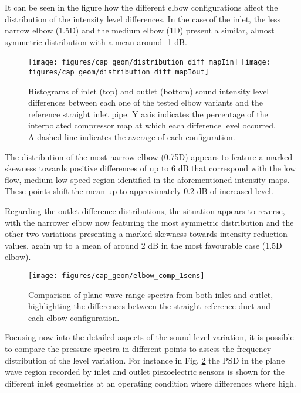 It can be seen in the figure how the different elbow configurations affect the distribution of the intensity level differences. In the case of the inlet, the less narrow elbow (1.5D) and the medium elbow (1D) present a similar, almost symmetric distribution with a mean around -1 dB.

\begin{figure}[htb!]
\centering
\texttt{[image: figures/cap\_geom/distribution\_diff\_mapIin]}
\texttt{[image: figures/cap\_geom/distribution\_diff\_mapIout]}
\caption{Histograms of inlet (top) and outlet (bottom) sound intensity level differences between each one of the tested elbow variants and the reference straight inlet pipe. Y axis indicates the percentage of the interpolated compressor map at which each difference level occurred. A dashed line indicates the average of each configuration.}
\label{fig:elbow_intens_histog}
\end{figure}

The distribution of the most narrow elbow (0.75D) appears to feature a marked skewness towards positive differences of up to 6 dB that correspond with the low flow, medium-low speed region identified in the aforementioned intensity maps. These points shift the mean up to approximately 0.2 dB of increased level.

Regarding the outlet difference distributions, the situation appears to reverse, with the narrower elbow now featuring the most symmetric distribution and the other two variations presenting a marked skewness towards intensity reduction values, again up to a mean of around 2 dB in the most favourable case (1.5D elbow).

\begin{figure}[htb!]
\centering
\texttt{[image: figures/cap\_geom/elbow\_comp\_1sens]}
\caption{Comparison of plane wave range spectra from both inlet and outlet, highlighting the differences between the straight reference duct and each elbow configuration.}
\label{fig:elbow_comp_1sens}
\end{figure}

Focusing now into the detailed aspects of the sound level variation, it is possible to compare the pressure spectra in different points to assess the frequency distribution of the level variation. For instance in Fig. \ref{fig:elbow_comp_1sens} the PSD in the plane wave region recorded by inlet and outlet piezoelectric sensors is shown for the different inlet geometries at an operating condition where differences where high.

